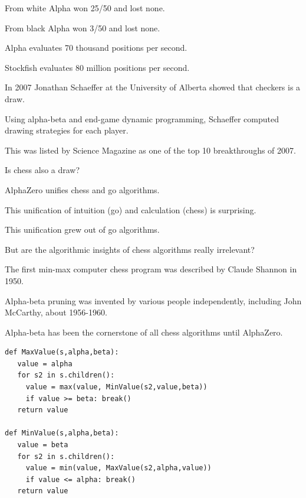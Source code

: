 {

From white Alpha won 25/50 and lost none.

\vfill
From black Alpha won 3/50 and lost none.

\vfill
Alpha evaluates 70 thousand positions per second.

\vfill
Stockfish evaluates 80 million positions per second.


In 2007 Jonathan Schaeffer at the University of Alberta showed that checkers is a draw.

\vfill
Using alpha-beta and end-game dynamic programming, Schaeffer computed drawing strategies for each player.

\vfill
This was listed by Science Magazine as one of the top 10 breakthroughs of 2007.

\vfill
Is chess also a draw?


AlphaZero unifies chess and go algorithms.

\vfill
This unification of intuition (go) and calculation (chess) is surprising.

\vfill
This unification grew out of go algorithms.

\vfill
But are the algorithmic insights of chess algorithms really irrelevant?


The first min-max computer chess program was described by Claude Shannon in 1950.

\vfill
Alpha-beta pruning was invented by various people independently, including John McCarthy, about 1956-1960.

\vfill
Alpha-beta has been the cornerstone of all chess algorithms until AlphaZero.



\begin{verbatim}
def MaxValue(s,alpha,beta):
   value = alpha
   for s2 in s.children():
     value = max(value, MinValue(s2,value,beta))
     if value >= beta: break()
   return value

def MinValue(s,alpha,beta):
   value = beta
   for s2 in s.children():
     value = min(value, MaxValue(s2,alpha,value))
     if value <= alpha: break()
   return value
\end{verbatim}


}
